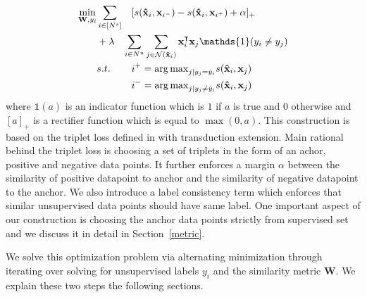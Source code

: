 \begin{equation}
\begin{aligned}
\min_{\mathbf{W}, y_i} &\sum_{i \in [N^s]} &&[s(\xsi,\mathbf{x}_{i^-}) - s(\xsi,\mathbf{x}_{i^+}) + \alpha]_{+}  \\
&+\lambda &&\hspace{-3mm}\sum_{i \in N^u} \sum_{j \in \mathcal{N}(\xsi)}  \xui^\intercal \xuj \mathds{1}(y_i \neq y_j)\\
&s.t. \quad &&i^{+} = {\arg\max}_{j | y_j = \hat{y}_i} s(\mathbf{\hat{x}}_i,\mathbf{x}_{j}) \\
&\quad &&i^{-} = {\arg\max}_{j | y_j \neq \hat{y}_i} s(\mathbf{\hat{x}}_i,\mathbf{x}_{j}) 
\end{aligned}
\label{loss}
\end{equation}
where $\mathds{1}(a)$ is an indicator function which is $1$ if $a$ is true and $0$ otherwise and $[a]_+$ is a rectifier function which is equal to $\max(0, a)$. This construction is based on the triplet loss defined in \cite{lmnn} with transduction extension. Main rational behind the triplet loss is choosing a set of triplets in the form of an achor, positive and negative data points. It further enforces a margin $\alpha$ between the similarity of positive datapoint to anchor and the similarity of negative datapoint to the anchor. We also introduce a label consistency term which enforces that similar unsupervised data points should have same label. One important aspect of our construction is choosing the anchor data points strictly from supervised set and we discuss it in detail in Section~\ref{metric}.

We solve this optimization problem via alternating minimization through iterating over solving for unsupervised labels $y_i$ and the similarity metric $\mathbf{W}$. We explain these two steps the following sections.

